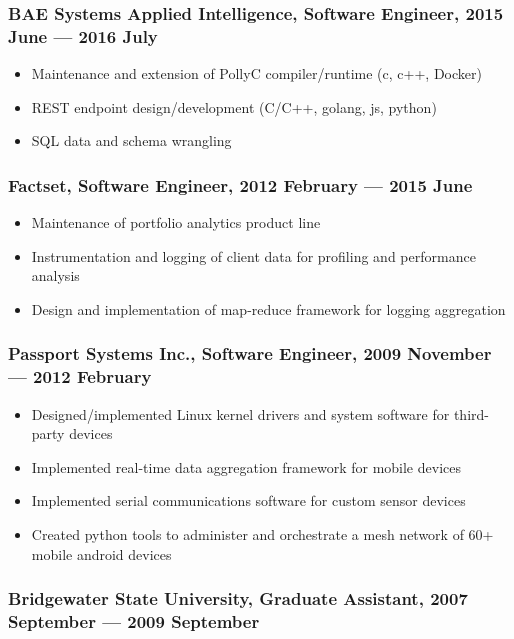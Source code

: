 \documentclass[letterpaper,11pt]{article}
\begin{document}
\subsubsection*{BAE Systems Applied Intelligence, Software Engineer, 2015 June --- 2016 July}

\begin{itemize}
\item Maintenance and extension of PollyC compiler/runtime (c, c++, Docker)
\item REST endpoint design/development (C/C++, golang, js, python)
\item SQL data and schema wrangling
\end{itemize}

\subsubsection*{Factset, Software Engineer, 2012 February --- 2015 June}

\begin{itemize}
\item Maintenance of portfolio analytics product line
\item Instrumentation and logging of client data for profiling and performance analysis
\item Design and implementation of map-reduce framework for logging aggregation
\end{itemize}

\subsubsection*{Passport Systems Inc., Software Engineer, 2009 November --- 2012 February}

\begin{itemize}
\item Designed/implemented Linux kernel drivers and system software for
  third-party devices
\item Implemented real-time data aggregation framework for mobile devices
\item Implemented serial communications software for custom sensor devices
\item Created python tools to administer and orchestrate a mesh network of 60+
  mobile android devices
\end{itemize}

\subsubsection*{Bridgewater State University, Graduate Assistant, 2007 September --- 2009 September}
\end{document}

